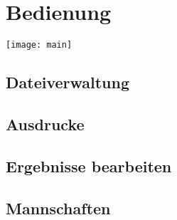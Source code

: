 \chapter{Bedienung}

\texttt{[image: main]}

\section{Dateiverwaltung}


\section{Ausdrucke}

\section{Ergebnisse bearbeiten}

\section{Mannschaften}